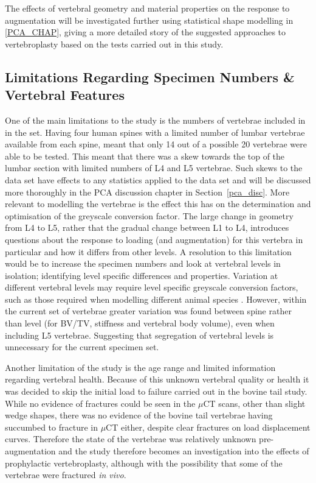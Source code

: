 The effects of vertebral geometry and material properties on the response to
augmentation will be investigated further using statistical shape modelling in
\cref{PCA_CHAP}, giving a more detailed story of the suggested approaches to
vertebroplasty based on the tests carried out in this study.

\subsection{Limitations Regarding Specimen Numbers \& Vertebral Features}

One of the main limitations to the study is the numbers of vertebrae included
in in the set.  Having four human spines with a limited number of lumbar
vertebrae available from each spine, meant that only 14 out of a possible 20
vertebrae were able to be tested.  This meant that there was a skew towards the
top of the lumbar section with limited numbers of L4 and L5 vertebrae.  Such
skews to the data set have effects to any statistics applied to the data set
and will be discussed more thoroughly in the PCA discussion chapter in
Section~\ref{pca_disc}.  More relevant to modelling the vertebrae is the effect
this has on the determination and optimisation of the greyscale conversion
factor.  The large change in geometry from L4 to L5, rather that the gradual
change between L1 to L4, introduces questions about the response to loading
(and augmentation) for this vertebra in particular and how it differs from
other levels.  A resolution to this limitation would be to increase the
specimen numbers and look at vertebral levels in isolation; identifying level
specific differences and properties.  Variation at different vertebral levels
may require level specific greyscale conversion factors, such as those required
when modelling different animal species \cite{zapata2017methodology}.  However,
within the current set of vertebrae greater variation was found between spine
rather than level (for BV/TV, stiffness and vertebral body volume), even when
including L5 vertebrae.  Suggesting that segregation of vertebral levels is
unnecessary for the current specimen set. 

Another limitation of the study is the age range and limited information
regarding vertebral health.  Because of this unknown vertebral quality or
health it was decided to skip the initial load to failure carried out in the
bovine tail study.  While no evidence of fractures could be seen in the $\mu$CT
scans, other than slight wedge shapes, there was no evidence of the bovine tail
vertebrae having succumbed to fracture in $\mu$CT either, despite clear
fractures on load displacement curves.  Therefore the state of the vertebrae
was relatively unknown pre-augmentation and the study therefore becomes an
investigation into the effects of prophylactic vertebroplasty, although with
the possibility that some of the vertebrae were fractured \textit{in vivo}.




